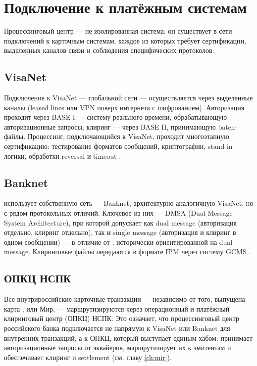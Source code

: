 \section{Подключение к платёжным системам}
\label{sec:pc-connectivity}

Процессинговый центр — не изолированная система: он существует
в сети подключений к карточным системам, каждое из которых
требует сертификации, выделенных каналов связи и соблюдения
специфических протоколов.

\subsection*{VisaNet}

Подключение к VisaNet — глобальной сети  —
осуществляется через выделенные каналы (leased lines
или VPN поверх интернета с шифрованием). Авторизация проходит
через BASE I — систему реального времени, обрабатывающую
авторизационные запросы; клиринг — через BASE II, принимающую
batch-файлы. Процессинг, подключающийся к VisaNet, проходит
многоэтапную сертификацию: тестирование форматов сообщений,
криптографии, stand-in логики, обработки reversal
и timeout .

\subsection*{Banknet}

 использует собственную сеть — Banknet,
архитектурно аналогичную VisaNet, но с рядом протокольных
отличий. Ключевое из них — DMSA (Dual Message System
Architecture), при которой  допускает как dual
message (авторизация отдельно, клиринг отдельно), так и single
message (авторизация и клиринг в одном сообщении) —
в отличие от , исторически ориентированной
на dual message. Клиринговые файлы 
передаются в формате IPM через систему
GCMS .

\subsection*{ОПКЦ НСПК}

Все внутрироссийские карточные транзакции — независимо
от того, выпущена карта , 
или Мир, — маршрутизируются через операционный и платёжный
клиринговый центр (ОПКЦ) НСПК. Это означает, что процессинговый
центр российского банка подключается не напрямую к VisaNet
или Banknet для внутренних транзакций, а к ОПКЦ, который
выступает единым хабом: принимает авторизационные запросы
от эквайеров, маршрутизирует их к эмитентам и обеспечивает
клиринг и settlement (см. главу \ref{ch:mir}).

